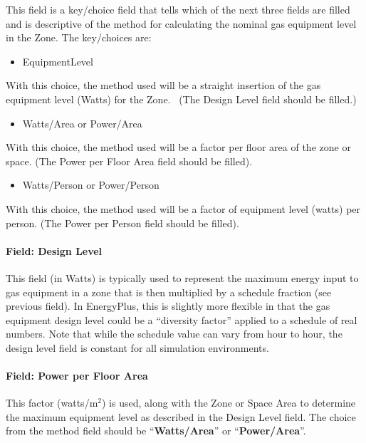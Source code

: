 This field is a key/choice field that tells which of the next three fields are filled and is descriptive of the method for calculating the nominal gas equipment level in the Zone. The key/choices are:

\begin{itemize}
\tightlist
\item
  EquipmentLevel
\end{itemize}

With this choice, the method used will be a straight insertion of the gas equipment level (Watts) for the Zone.~ (The Design Level field should be filled.)

\begin{itemize}
\tightlist
\item
  Watts/Area or Power/Area
\end{itemize}

With this choice, the method used will be a factor per floor area of the zone or space. (The Power per Floor Area field should be filled).

\begin{itemize}
\tightlist
\item
  Watts/Person or Power/Person
\end{itemize}

With this choice, the method used will be a factor of equipment level (watts) per person. (The Power per Person field should be filled).

\paragraph{Field: Design Level}\label{field-design-level-1-000}

This field (in Watts) is typically used to represent the maximum energy input to gas equipment in a zone that is then multiplied by a schedule fraction (see previous field). In EnergyPlus, this is slightly more flexible in that the gas equipment design level could be a ``diversity factor'' applied to a schedule of real numbers. Note that while the schedule value can vary from hour to hour, the design level field is constant for all simulation environments.

\paragraph{Field: Power per Floor Area}\label{field-power-per-zone-floor-area}

This factor (watts/m\(^{2}\)) is used, along with the Zone or Space Area to determine the maximum equipment level as described in the Design Level field. The choice from the method field should be ``\textbf{Watts/Area}'' or ``\textbf{Power/Area}''.

